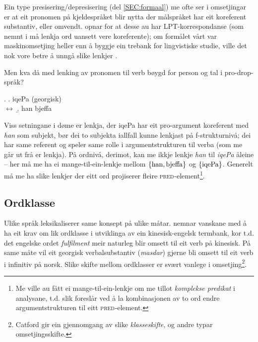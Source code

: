\documentclass[12pt,a4paper,oneside,draft]{report}
\newcommand{\F}[2]{\textsc{#1}\ensuremath{_{#2}}}
\newcommand{\PRED}{\F{pred}{}}
\begin{document}
Ein type presisering/depresisering (del \ref{SEC:formaal}) me ofte ser
 i omsetjingar er at eit pronomen på kjeldespråket blir nytta der
 målspråket har eit koreferent substantiv, eller
 omvendt. \citet{dyvik2009lmp} opnar for at desse au har
 LPT\hyp{}korrespondanse (som nemnt i \cite{thunes2003eal} må lenkja ord
 uansett vere koreferente); om formålet vårt var maskinomsetjing
 heller enn å byggje ein trebank for lingvistiske studie, ville det
 nok vore betre å unngå slike lenkjer \citep[s.~53]{volk2008hjp}.

Men kva då med lenking av pronomen til verb bøygd for person og tal i
pro-drop-språk?

\ex. \a. iqePa                                  \hfill{} (georgisk) \\
     $\leftrightarrow$
     \b. han bjeffa

Viss setningane i døme \Last er lenkja, der iqePa har eit
 pro\hyp{}argument koreferent med \emph{han} som subjekt, bør dei to
 subjekta iallfall kunne lenkjast på f\hyp{}strukturnivå; dei har same
 referent og speler same rolle i argumentstrukturen til verba (som me
 går ut frå er lenkja). På ordnivå, derimot, kan me ikkje lenkje \emph{han}
 til \emph{iqePa} åleine -- her må me ha ei mange-til-ein-lenkje mellom $\{
 \rm han, bjeffa \}$ og $\{ \rm iqePa \}$.  Generelt må me ha slike
 lenkjer der eitt ord projiserer fleire \PRED{}-element\footnote{Me ville au fått ei mange-til-ein-lenkje om me tillot
        \emph{komplekse predikat} i analysane, t.d. slik
        \citet{butt1998merger} foreslår ved å la kombinasjonen av to
        ord endre argumentstrukturen til eitt \PRED{}-element. }.

\subsection{Ordklasse}
\label{sec-3.5.1}

Ulike språk leksikaliserer same konsept på ulike
måtar. \citet[s.~3]{cheung2002scg} nemnar vanskane med å ha eit krav
om lik ordklasse i utviklinga av ein kinesisk-engelsk termbank, kor
t.d. det engelske ordet \emph{fulfilment} meir naturleg blir omsett til eit
verb på kinesisk. På same måte vil eit georgisk verbalsubstantiv
(\emph{masdar}) gjerne bli omsett til eit verb i infinitiv på
norsk. Slike skifte mellom ordklasser er svært vanlege i
omsetjing\footnote{Catford \citep[1965, i][s.~61]{munday2001its} gir ein gjennomgang av
       slike \emph{klasseskifte}, og andre typar omsetjingsskifte. }.
\end{document}
